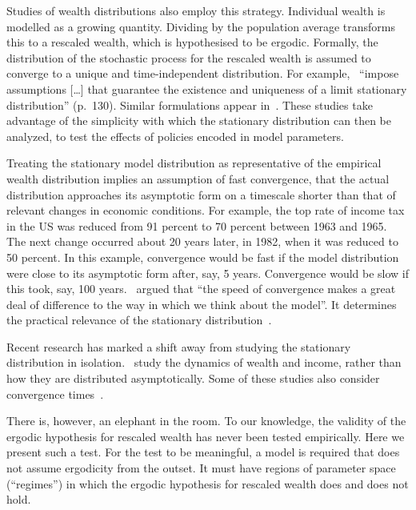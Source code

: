 Studies of wealth distributions also employ this strategy. Individual wealth is modelled as a growing quantity. Dividing by the population average transforms this to a rescaled wealth, which is hypothesised to be ergodic. Formally, the distribution of the stochastic process for the rescaled wealth is assumed to converge to a unique and time-independent distribution. For example,~\cite{BenhabibBisinZhu2011} ``impose assumptions [\ldots] that guarantee the existence and uniqueness of a limit stationary distribution'' (p.~130). Similar formulations appear in~\cite{stiglitz1969distribution,bewley1977permanent,piketty2013theory,de2015quantitative,de2015piketty,jones2015pareto}. These studies take advantage of the simplicity with which the stationary distribution can then be analyzed, \eg to test the effects of policies encoded in model parameters.

Treating the stationary model distribution as representative of the empirical wealth distribution implies an assumption of fast convergence, \ie that the actual distribution approaches its asymptotic form on a timescale shorter than that of relevant changes in economic conditions. For example, the top rate of income tax in the US was reduced from 91 percent to 70 percent between 1963 and 1965. The next change occurred about 20 years later, in 1982, when it was reduced to 50 percent. In this example, convergence would be fast if the model distribution were close to its asymptotic form after, say, 5 years. Convergence would be slow if this took, say, 100 years.~\cite[p.~137] {atkinson1969timescale} argued that ``the speed of convergence makes a great deal of difference to the way in which we think about the model''. It determines the practical relevance of the stationary distribution~\cite{atkinson1969timescale,cowell2014piketty}.

Recent research has marked a shift away from studying the stationary distribution in isolation.~\cite{gabaix2015dynamics,BermanBen-JacobShapira2016,kaymak2016evolution,berman2017revisiting} study the dynamics of wealth and income, rather than how they are distributed asymptotically. Some of these studies also consider convergence times~\cite{gabaix2015dynamics,berman2017revisiting}.

There is, however, an elephant in the room. To our knowledge, the validity of the ergodic hypothesis for rescaled wealth has never been tested empirically. Here we present such a test. For the test to be meaningful, a model is required that does not assume ergodicity from the outset. It must have regions of parameter space (``regimes'') in which the ergodic hypothesis for rescaled wealth does and does not hold.

